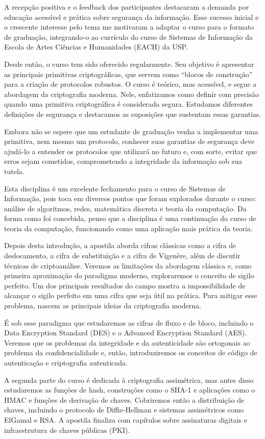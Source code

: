 A recepção positiva e o feedback dos participantes destacaram a demanda por educação acessível e prática sobre segurança da informação.
Esse sucesso inicial e o crescente interesse pelo tema me motivaram a adaptar o curso para o formato de graduação, integrando-o ao currículo do curso de Sistemas de Informação da Escola de Artes Ciências e Humanidades (EACH) da USP.

Desde então, o curso tem sido oferecido regularmente.
Seu objetivo é apresentar as principais primitivas criptográficas, que servem como ``blocos de construção'' para a criação de protocolos robustos.
O curso é teórico, mas acessível, e segue a abordagem da criptografia moderna.
Nele, enfatizamos como definir com precisão quando uma primitiva criptográfica é considerada segura.
Estudamos diferentes definições de segurança e destacamos as suposições que sustentam essas garantias.

Embora não se espere que um estudante de graduação venha a implementar uma primitiva, nem mesmo um protocolo, conhecer suas garantias de segurança deve ajudá-lo a entender os protocolos que utilizará no futuro e, com sorte, evitar que erros sejam cometidos, comprometendo a integridade da informação sob sua tutela.

Esta disciplina é um excelente fechamento para o curso de Sistemas de Informação, pois toca em diversos pontos que foram explorados durante o curso: análise de algoritmos, redes, matemática discreta e teoria da computação.
Da forma como foi concebida, penso que a disciplina é uma continuação do curso de teoria da computação, funcionando como uma aplicação mais prática da teoria.

Depois desta introdução, a apostila aborda cifras clássicas como a cifra de deslocamento, a cifra de substituição e a cifra de Vigenère, além de discutir técnicas de criptoanálise.
Veremos as limitações da abordagem clássica e, como primeira aproximação do paradigma moderno, exploraremos o conceito de sigilo perfeito.
Um dos principais resultados do campo mostra a impossibilidade de alcançar o sigilo perfeito em uma cifra que seja útil na prática.
Para mitigar esse problema, nascem as principais ideias da criptografia moderna.

É sob esse paradigma que estudaremos as cifras de fluxo e de bloco, incluindo o Data Encryption Standard (DES) e o Advanced Encryption Standard (AES).
Veremos que os problemas da integridade e da autenticidade são ortogonais ao problema da confidencialidade e, então, introduziremos os conceitos de código de autenticação e criptografia autenticada.

A segunda parte do curso é dedicada à criptografia assimétrica, mas antes disso estudaremos as funções de hash, construções como o SHA-1 e aplicações como o HMAC e funções de derivação de chaves.
Cobriremos então a distribuição de chaves, incluindo o protocolo de Diffie-Hellman e sistemas assimétricos como ElGamal e RSA.
A apostila finaliza com capítulos sobre assinaturas digitais e infraestrutura de chaves públicas (PKI).


